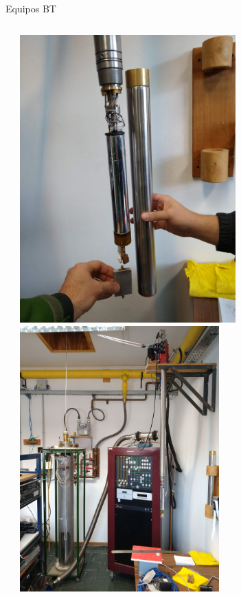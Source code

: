 \documentclass[ignorenonframetext,12pt]{beamer}
\begin{document}
\begin{frame}{Equipos BT}
\begin{columns}
\begin{column}{0.45\textwidth}
								\end{column}
								\begin{column}{0.45\textwidth}
												\includegraphics[angle=-90, width=0.65\textwidth]{IMG_20190523_105443289} \\ 
												\includegraphics[angle=-90,width=0.6\textwidth]{IMG_20190523_105117465}
								\end{column}
				\end{columns}


%
%
%
%
\end{frame}
\end{document}
